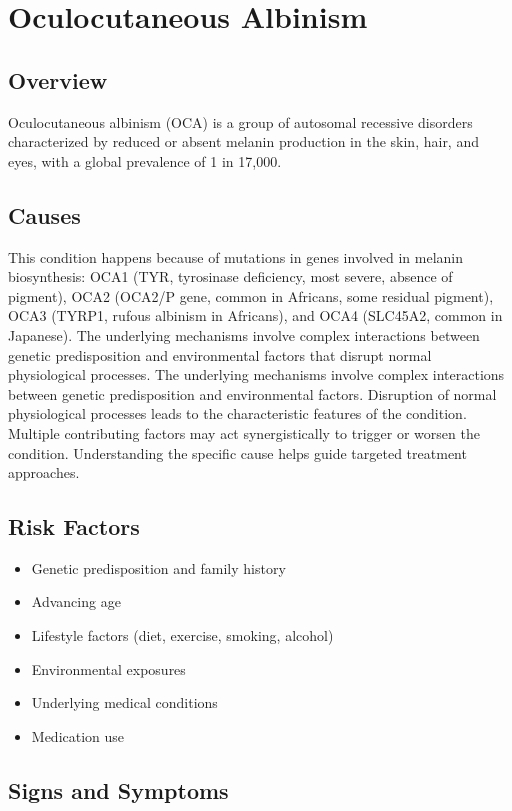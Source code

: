 \chapter{Oculocutaneous Albinism}
\label{sec:Oculocutaneous Albinism}

\section{Overview}
Oculocutaneous albinism (OCA) is a group of autosomal recessive disorders characterized by reduced or absent melanin production in the skin, hair, and eyes, with a global prevalence of 1 in 17,000.
\section{Causes}
This condition happens because of mutations in genes involved in melanin biosynthesis: OCA1 (TYR, tyrosinase deficiency, most severe, absence of pigment), OCA2 (OCA2/P gene, common in Africans, some residual pigment), OCA3 (TYRP1, rufous albinism in Africans), and OCA4 (SLC45A2, common in Japanese). The underlying mechanisms involve complex interactions between genetic predisposition and environmental factors that disrupt normal physiological processes. The underlying mechanisms involve complex interactions between genetic predisposition and environmental factors. Disruption of normal physiological processes leads to the characteristic features of the condition. Multiple contributing factors may act synergistically to trigger or worsen the condition. Understanding the specific cause helps guide targeted treatment approaches.
\section{Risk Factors}


\begin{itemize}[noitemsep]
  \item Genetic predisposition and family history
  \item Advancing age
  \item Lifestyle factors (diet, exercise, smoking, alcohol)
  \item Environmental exposures
  \item Underlying medical conditions
  \item Medication use
\end{itemize}
\section{Signs and Symptoms}

